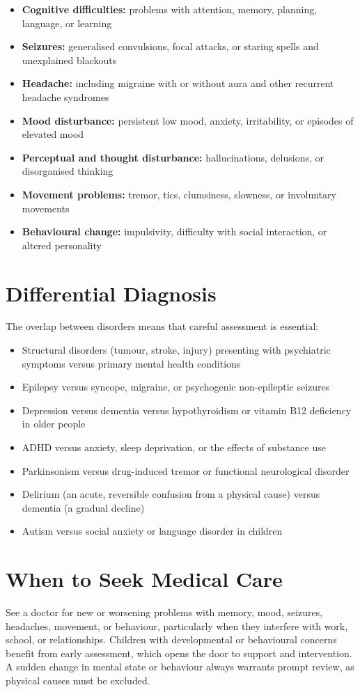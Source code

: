 \begin{itemize}
    \item \textbf{Cognitive difficulties:} problems with attention, memory, planning, language, or learning
    \item \textbf{Seizures:} generalised convulsions, focal attacks, or staring spells and unexplained blackouts
    \item \textbf{Headache:} including migraine with or without aura and other recurrent headache syndromes
    \item \textbf{Mood disturbance:} persistent low mood, anxiety, irritability, or episodes of elevated mood
    \item \textbf{Perceptual and thought disturbance:} hallucinations, delusions, or disorganised thinking
    \item \textbf{Movement problems:} tremor, tics, clumsiness, slowness, or involuntary movements
    \item \textbf{Behavioural change:} impulsivity, difficulty with social interaction, or altered personality
\end{itemize}

\section*{Differential Diagnosis}
The overlap between disorders means that careful assessment is essential:

\begin{itemize}
    \item Structural disorders (tumour, stroke, injury) presenting with psychiatric symptoms versus primary mental health conditions
    \item Epilepsy versus syncope, migraine, or psychogenic non-epileptic seizures
    \item Depression versus dementia versus hypothyroidism or vitamin B12 deficiency in older people
    \item ADHD versus anxiety, sleep deprivation, or the effects of substance use
    \item Parkinsonism versus drug-induced tremor or functional neurological disorder
    \item Delirium (an acute, reversible confusion from a physical cause) versus dementia (a gradual decline)
    \item Autism versus social anxiety or language disorder in children
\end{itemize}

\section*{When to Seek Medical Care}
See a doctor for new or worsening problems with memory, mood, seizures, headaches, movement, or behaviour, particularly when they interfere with work, school, or relationships. Children with developmental or behavioural concerns benefit from early assessment, which opens the door to support and intervention. A sudden change in mental state or behaviour always warrants prompt review, as physical causes must be excluded.

